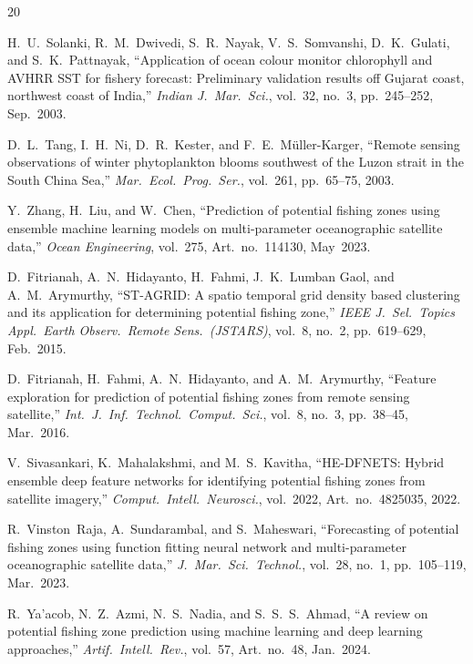 \documentclass[conference]{IEEEtran}
\begin{document}
\begin{thebibliography}{20}

H.~U.~Solanki, R.~M.~Dwivedi, S.~R.~Nayak, V.~S.~Somvanshi,
D.~K.~Gulati, and S.~K.~Pattnayak, ``Application of ocean colour
monitor chlorophyll and AVHRR SST for fishery forecast: Preliminary
validation results off Gujarat coast, northwest coast of India,''
\emph{Indian J.\ Mar.\ Sci.}, vol.~32, no.~3, pp.~245--252,
Sep.~2003.

D.~L.~Tang, I.~H.~Ni, D.~R.~Kester, and F.~E.~M{\"u}ller-Karger,
``Remote sensing observations of winter phytoplankton blooms southwest
of the Luzon strait in the South China Sea,'' \emph{Mar.\ Ecol.\
Prog.\ Ser.}, vol.~261, pp.~65--75, 2003.

Y.~Zhang, H.~Liu, and W.~Chen, ``Prediction of potential fishing zones
using ensemble machine learning models on multi-parameter oceanographic
satellite data,'' \emph{Ocean Engineering}, vol.~275, Art.~no.~114130,
May~2023.

D.~Fitrianah, A.~N.~Hidayanto, H.~Fahmi, J.~K.~Lumban Gaol, and
A.~M.~Arymurthy, ``ST-AGRID: A spatio temporal grid density based
clustering and its application for determining potential fishing
zone,'' \emph{IEEE J.\ Sel.\ Topics Appl.\ Earth Observ.\ Remote
Sens.\ (JSTARS)}, vol.~8, no.~2, pp.~619--629, Feb.~2015.

D.~Fitrianah, H.~Fahmi, A.~N.~Hidayanto, and A.~M.~Arymurthy,
``Feature exploration for prediction of potential fishing zones from
remote sensing satellite,'' \emph{Int.\ J.\ Inf.\ Technol.\ Comput.\
Sci.}, vol.~8, no.~3, pp.~38--45, Mar.~2016.

V.~Sivasankari, K.~Mahalakshmi, and M.~S.~Kavitha, ``HE-DFNETS: Hybrid
ensemble deep feature networks for identifying potential fishing zones
from satellite imagery,'' \emph{Comput.\ Intell.\ Neurosci.},
vol.~2022, Art.~no.~4825035, 2022.

R.~Vinston~Raja, A.~Sundarambal, and S.~Maheswari, ``Forecasting of
potential fishing zones using function fitting neural network and
multi-parameter oceanographic satellite data,'' \emph{J.\ Mar.\ Sci.\
Technol.}, vol.~28, no.~1, pp.~105--119, Mar.~2023.

\bibitem{yaacob2024}
R.~Ya'acob, N.~Z.~Azmi, N.~S.~Nadia, and S.~S.~S.~Ahmad, ``A review
on potential fishing zone prediction using machine learning and deep
learning approaches,'' \emph{Artif.\ Intell.\ Rev.}, vol.~57,
Art.~no.~48, Jan.~2024.


\end{thebibliography}
\end{document}
